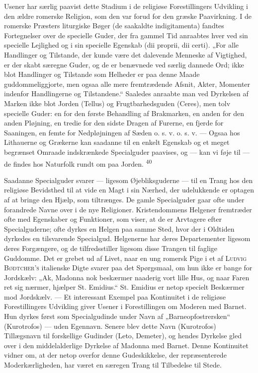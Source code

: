 \documentclass[12pt,a4paper,openany]{book}
\newcommand{\opage}[1]{\marginnote{\footnotesize\textit{[#1]}}}
\begin{document}
Usener har særlig paavist dette Stadium i de religiøse Forestillingers
Udvikling i den ældre romerske Religion, som den var forud for den
græske Paavirkning. I de romerske Præsters liturgiske Bøger (de
saakaldte indigitamenta) fandtes Fortegnelser over de specielle Guder,
der fra gammel Tid anraabtes hver ved sin specielle Lejlighed og i sin
specielle Egenskab (dii proprii, dii certi). „For alle Handlinger og
Tilstande, der kunde være det dalevende Menneske af Vigtighed, er der
skabt særegne Guder, og de er benævnede ved særlig dannede Ord; ikke
blot Handlinger og Tilstande som Helheder er paa denne Maade
guddommeliggjorte, men ogsaa alle mere fremtrædende Afsnit, Akter,
Momenter indenfor Handlingerne og Tilstandene.“ Saaledes anraabte man
ved Dyrkelsen af Marken ikke blot Jorden (Tellus) og Frugtbarhedsguden
(Ceres), men tolv specielle Guder: en for den første Behandling af
Brakmarken, en anden for den anden Pløjning, en tredie for den sidste
Dragen af Furerne, en fjerde for Saaningen, en femte for Nedpløjningen
af Sæden o. s. v. o. s. v. --- Ogsaa hos Lithauerne og Grækerne kan
saadanne til en enkelt Egenskab og et meget begrænset Omraade
indskrænkede Specialguder paavises, og --- kan vi føje til --- de findes
hos Naturfolk rundt om paa Jorden. \textsuperscript{40}

Saadanne Specialguder svarer --- ligesom Øjebliksguderne --- til en
Trang hos den religiøse Bevidsthed til at vide en Magt i sin Nærhed, der
udelukkende er optagen af at bringe den Hjælp,
\opage{92}som tiltrænges. De gamle Specialguder gaar ofte under
forandrede Navne over i de nye Religioner. Kristendommens Helgener
fremtræder ofte med Egenskaber og Funktioner, som viser, at de er
Arvtagere efter Specialguderne; ofte dyrkes en Helgen paa samme Sted,
hvor der i Oldtiden dyrkedes en tilsvarende Specialgud. Helgenerne har
deres Departementer ligesom deres Forgængere, og de tilfredsstiller
ligesom disse Trangen til faglige Guddomme. Det er grebet ud af Livet,
naar en ung romersk Pige i et af \textsc{Ludvig Bødtcher’s} italienske
Digte svarer paa det Spørgsmaal, om hun ikke er bange for Jordskælv:
„Ak, Madonna nok beskærmer naaderig vort lille Hus, og naar Faren ret
sig nærmer, hjælper St. Emidius.“ St. Emidius er netop specielt
Beskærmer mod Jordskælv. --- Et interessant Exempel paa Kontinuitet i de
religiøse Forestillingers Udvikling giver Usener i Forestillingen om
Moderen med Barnet. Hun dyrkes først som Specialgudinde under Navn af
„Barneopfostrersken“ (Kurotrofos) --- uden Egennavn. Senere blev dette
Navn (Kurotrofos) Tillægsnavn til forskellige Gudinder (Leto, Demeter),
og hendes Dyrkelse gled over i den middelalderlige Dyrkelse af Madonna
med Barnet. Denne Kontinuitet vidner om, at der netop overfor denne
Gudeskikkelse, der repræsenterede Moderkærligheden, har været en særegen
Trang til Tilbedelse til Stede.
\end{document}
